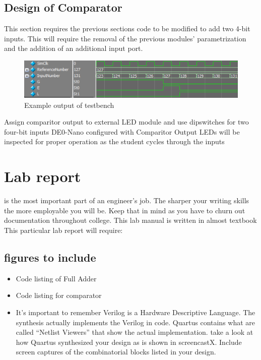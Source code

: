   \subsection{Design of Comparator}
    This section requires the previous sections code to be modified to add two 4-bit inputs. This will require the removal of the previous modules' parametrization and the addition of an additional input port. 
    \begin{figure}[H]
      \label{TestbenchOutput}
      \includegraphics[width=.48\textwidth]{Images/ComparitorTestbench.png}
      \caption{Example output of testbench}
    \end{figure}

      {Assign comparitor output to external LED module and use dipswitches for two four-bit inputs}
      {DE0-Nano configured with Comparitor}
      {Output LEDs will be inspected for proper operation as the student cycles through the inputs}

  \section{Lab report}
     is the most important part of an engineer's job. The sharper your writing skills the more employable you will be. Keep that in mind as you have to churn out documentation throughout college. This lab manual is written in almost textbook This particular lab report will require:
    \subsection{figures to include}
    \begin{itemize}
      \item Code listing of Full Adder
      \item Code listing for comparator
      \item It's important to remember Verilog is a Hardware Descriptive Language. The synthesis actually implements the Verilog in code. Quartus contains what are called ``Netlist Viewers'' that show the actual implementation. take a look at how Quartus synthesized your design as is shown in screencastX. Include screen captures of the combinatorial blocks listed in your design.
    \end{itemize}

